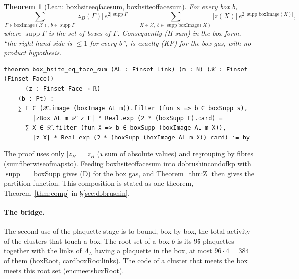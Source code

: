 \documentclass[11pt,a4paper]{article}
\newtheorem{theorem}{Theorem}[section]
\theoremstyle{definition}
\theoremstyle{remark}
\DeclareRobustCommand{\lean}[1]{{\ttfamily\renewcommand{\_}{\textunderscore\allowbreak}#1}}
\newenvironment{leanquote}{\par\smallskip\footnotesize}{\par\smallskip}
\newcommand{\supp}{\operatorname{supp}}
\begin{document}
\begin{theorem}[Lean: \lean{box\_hsite\_eq\_face\_sum}, \lean{box\_hsite\_of\_face\_sum}]\label{thm:eq}
For every box $b$,
\[
\sum_{\Gamma\in\mathrm{boxImage}(\mathcal X),\ b\in\supp\Gamma}|z_B(\Gamma)|\,e^{2|\supp\Gamma|}
=\sum_{X\in\mathcal X,\ b\in\supp\mathrm{boxImage}(X)}|z(X)|\,e^{2|\supp\mathrm{boxImage}(X)|},
\]
where $\supp\Gamma$ is the set of boxes of $\Gamma$. Consequently (H-sum) in the box form, ``the right-hand side is $\le1$ for every $b$'', is exactly (KP) for the box gas, with no product hypothesis.
\end{theorem}
\begin{leanquote}
\begin{verbatim}
theorem box_hsite_eq_face_sum (ΛL : Finset Link) (m : ℕ) (𝒳 : Finset (Finset Face))
      (z : Finset Face → ℝ)
    (b : Pt) :
    ∑ Γ ∈ (𝒳.image (boxImage ΛL m)).filter (fun s => b ∈ boxSupp s),
        |zBox ΛL m 𝒳 z Γ| * Real.exp (2 * (boxSupp Γ).card) =
      ∑ X ∈ 𝒳.filter (fun X => b ∈ boxSupp (boxImage ΛL m X)),
        |z X| * Real.exp (2 * (boxSupp (boxImage ΛL m X)).card) := by
\end{verbatim}
\end{leanquote}
The proof uses only $|z_B|=z_B$ (a sum of absolute values) and regrouping by fibres (\lean{sum\_fiberwise\_of\_maps\_to}). Feeding \lean{box\_hsite\_of\_face\_sum} into \lean{dobrushin\_cond\_of\_kp} with $\supp=$ \lean{boxSupp} gives (D) for the box gas, and Theorem~\ref{thm:Z} then gives the partition function. This composition is stated as one theorem, Theorem~\ref{thm:comp} in \S\ref{sec:dobrushin}.

\paragraph{The bridge.} The second use of the plaquette stage is to bound, box by box, the total activity of the clusters that touch a box. The root set of a box $b$ is its $96$ plaquettes together with the links of $\Lambda_L$ having a plaquette in the box, at most $96\cdot4=384$ of them (\lean{boxRoot}, \lean{card\_boxRoot\_links}). The code of a cluster that meets the box meets this root set (\lean{enc\_meets\_boxRoot}).
\end{document}
